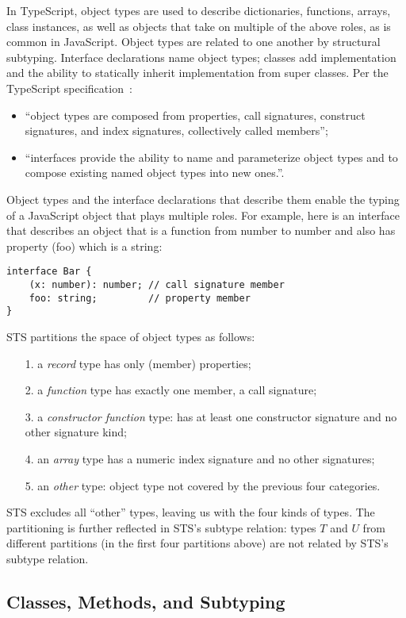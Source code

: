 In TypeScript, object types are used to describe dictionaries, functions, arrays, class instances,
as well as objects that take on multiple of the above roles, as is common in JavaScript. Object types are
related to one another by structural subtyping.  Interface declarations name object types; classes add implementation
and the ability to statically inherit implementation from super classes. Per the TypeScript specification~\cite{TSspec2016}:
\begin{itemize}
\item ``object types are composed from properties, call signatures, construct signatures, and index signatures, collectively called members'';
\item ``interfaces provide the ability to name and parameterize object types and to compose existing named object types into new ones.''.
\end{itemize}
Object types and the interface declarations that describe them enable the typing of a JavaScript object that plays multiple roles.
For example, here is an interface that describes an object that is a function from number to number
and also has property (foo) which is a string:
\begin{lstlisting}
interface Bar {
    (x: number): number; // call signature member
    foo: string;         // property member
}
\end{lstlisting}
STS partitions the space of object types as follows:
\begin{itemize}
\item[1.] a \emph{record} type has only (member) properties;
\item[2.] a \emph{function} type has exactly one member, a call signature;
\item[3.] a \emph{constructor function} type: has at least one constructor signature and no other signature kind;
\item[4.] an \emph{array} type has a numeric index signature and no other signatures;
\item[5.] an \emph{other} type: object type not covered by the previous four categories.
\end{itemize}
STS excludes all ``other'' types, leaving us with the four kinds of types.
The partitioning is further reflected in STS's subtype relation:
types $T$ and $U$ from different partitions (in the first four partitions above)
are not related by STS's subtype relation.

\subsection{Classes, Methods, and Subtyping}

